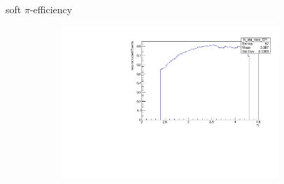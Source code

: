 \documentclass[11pt]{beamer}
\begin{document}
\begin{frame}{soft $\pi$-efficiency}
\begin{figure}
\begin{subfigure}{0.45\textwidth}
\end{subfigure}
\begin{subfigure}{0.45\textwidth}
\includegraphics[width=0.9\textwidth]{up_pdf/h_eta_reco_SPi.pdf}
\end{subfigure}
\end{figure}
\end{frame}
\end{document}
